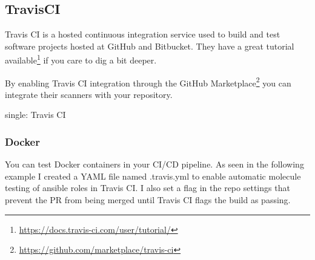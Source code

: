 \begin{Shaded}
\begin{Highlighting}[]
      \KeywordTok{-} 
            \KeywordTok{-}\KeywordTok{\{} \KeywordTok{\}}\NormalTok{\}}
            \KeywordTok{-}
      \KeywordTok{-} \AttributeTok{ }
 \StringTok{|}
  \AttributeTok{ }
      \KeywordTok{-}
      \KeywordTok{-}
\end{Highlighting}
\end{Shaded}

\hypertarget{travisci}{%
\subsection{TravisCI}\label{travisci}}

Travis CI is a hosted continuous integration service used to build and
test software projects hosted at GitHub and Bitbucket. They have a great
tutorial available\footnote{\url{https://docs.travis-ci.com/user/tutorial/}}
if you care to dig a bit deeper.

By enabling Travis CI integration through the GitHub
Marketplace\footnote{\url{https://github.com/marketplace/travis-ci}} you
can integrate their scanners with your repository.

single: Travis CI

\hypertarget{docker-1}{%
\subsubsection{Docker}\label{docker-1}}

You can test Docker containers in your CI/CD pipeline. As seen in the
following example I created a YAML file named .travis.yml to enable
automatic molecule testing of ansible roles in Travis CI. I also set a
flag in the repo settings that prevent the PR from being merged until
Travis CI flags the build as passing.


